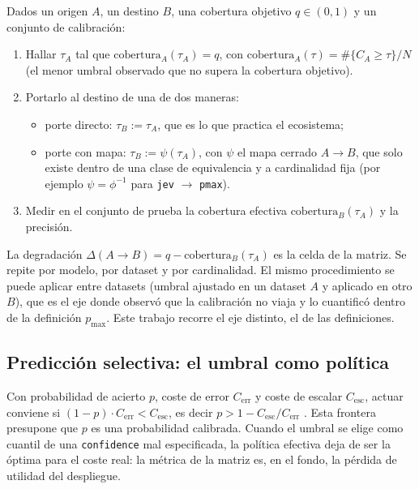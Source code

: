 Dados un origen $A$, un destino $B$, una cobertura objetivo $q \in (0, 1)$ y un conjunto de calibración:

\begin{enumerate}
\item Hallar $\tau_A$ tal que $\mathrm{cobertura}_A(\tau_A) = q$, con
  $\mathrm{cobertura}_A(\tau) = \#\{C_A \ge \tau\}/N$ (el menor umbral observado que no supera la cobertura
  objetivo).
\item Portarlo al destino de una de dos maneras:
  \begin{itemize}
  \item porte directo: $\tau_B := \tau_A$, que es lo que practica el ecosistema;
  \item porte con mapa: $\tau_B := \psi(\tau_A)$, con $\psi$ el mapa cerrado $A \to B$, que
    solo existe dentro de una clase de equivalencia y a cardinalidad fija (por ejemplo
    $\psi = \phi^{-1}$ para \texttt{jev} $\to$ \texttt{pmax}).
  \end{itemize}
\item Medir en el conjunto de prueba la cobertura efectiva $\mathrm{cobertura}_B(\tau_A)$ y la precisión.
\end{enumerate}

La degradación $\Delta(A \to B) = q - \mathrm{cobertura}_B(\tau_A)$ es la celda de la matriz. Se
repite por modelo, por dataset y por cardinalidad. El mismo procedimiento se puede aplicar entre
datasets (umbral ajustado en un dataset $A$ y aplicado en otro $B$), que es el eje donde \cite{jebadiah}
observó que la calibración no viaja y \cite{arXiv2609.33843} lo cuantificó dentro de la definición
$p_{\max}$. Este trabajo recorre el eje distinto, el de las definiciones.

\subsection{Predicción selectiva: el umbral como política}

Con probabilidad de acierto $p$, coste de error $C_{\mathrm{err}}$ y coste de escalar $C_{\mathrm{esc}}$,
actuar conviene si $(1-p)\cdot C_{\mathrm{err}} < C_{\mathrm{esc}}$, es decir
$p > 1 - C_{\mathrm{esc}}/C_{\mathrm{err}}$ \cite{chow1970}. Esta frontera presupone que $p$ es una
probabilidad calibrada. Cuando el umbral se elige como cuantil de una \texttt{confidence} mal especificada,
la política efectiva deja de ser la óptima para el coste real: la métrica de la matriz es, en el fondo, la
pérdida de utilidad del despliegue.

